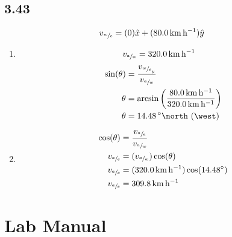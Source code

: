 \documentclass{article}
\begin{document}
\subsection{3.43}
\begin{align*}
	v_{\sfrac{w}{e}} & = (0)\hat{x} + (\SI{80.0}{\kilo \meter \per \hour})\hat{y}
\end{align*}
\begin{enumerate}[label=\textbf{(\alph*)}]
	\item
		\begin{align*}
			v_{\sfrac{a}{w}} & = \SI{320.0}{\kilo \meter \per \hour}
		\end{align*}
		\begin{align*}
			\sin(\theta) & = \frac{v_{\sfrac{w}{e}_y}}{v_{\sfrac{a}{w}}} \\
			\theta & = \arcsin \left( \frac{\SI{80.0}{\kilo \meter \per \hour}}{\SI{320.0}{\kilo \meter \per \hour}} \right) \\
			\theta & = \SI{14.48}{\degree \north \of \west}
		\end{align*}
	\item
		\begin{align*}
			\cos(\theta) & = \frac{v_{\sfrac{a}{e}}}{v_{\sfrac{a}{w}}} \\
			v_{\sfrac{a}{e}} & = (v_{\sfrac{a}{w}})\cos(\theta) \\
			v_{\sfrac{a}{e}} & = (\SI{320.0}{\kilo \meter \per \hour})\cos(\SI{14.48}{\degree}) \\
			v_{\sfrac{a}{e}} & = \SI{309.8}{\kilo \meter \per \hour}
		\end{align*}
\end{enumerate}

\section{Lab Manual}
\end{document}
